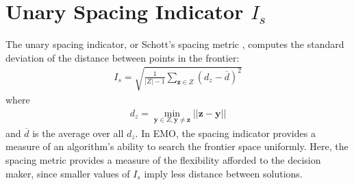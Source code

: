 \section{Unary Spacing Indicator $I_s$} The unary spacing indicator, or Schott's spacing metric \cite{schott1995fault}, computes the standard deviation of the distance between points in the frontier:
\begin{align}
I_s = \sqrt{\frac{1}{|Z|-1} \sum_{\mathbf{z} \in Z} (d_z - \overbar{d})^2}
\end{align}
where
\begin{align}
d_z = \min_{\mathbf{y} \in Z, \mathbf{y} \neq \mathbf{z}} ||\mathbf{z} - \mathbf{y}||
\end{align}
and $\overbar{d}$ is the average over all $d_z$. In EMO, the spacing indicator provides a measure of an algorithm's ability to search the frontier space uniformly. Here, the spacing metric provides a measure of the flexibility afforded to the decision maker, since smaller values of $I_s$ imply less distance between solutions.